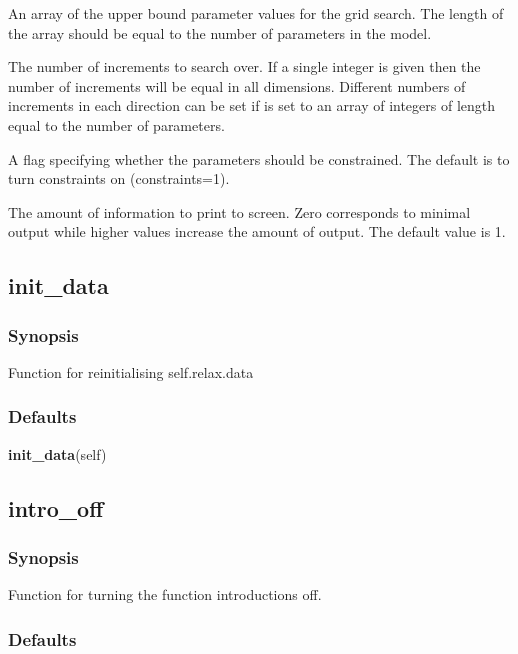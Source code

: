   An array of the upper bound  parameter values for the grid search.  The length of the array should be equal to the number of parameters in the model.

  The number of increments to search over.  If a single integer is given then the number of increments will be equal in all dimensions.  Different numbers of increments in each direction can be set if 
 is set to an array of integers of length equal to the number of parameters.

  A flag specifying whether the parameters should be constrained.  The default is to turn constraints  on (constraints=1).

  The amount of information to print to screen.  Zero corresponds to minimal output while higher values increase the amount of output.  The default value is 1.


\newpage

\subsection{init\_data}


\subsubsection{Synopsis}

Function for reinitialising self.relax.data

\subsubsection{Defaults}

\textsf{\textbf{init\_data}(self)}



\newpage

\subsection{intro\_off}


\subsubsection{Synopsis}

Function for turning the function introductions off.

\subsubsection{Defaults}

